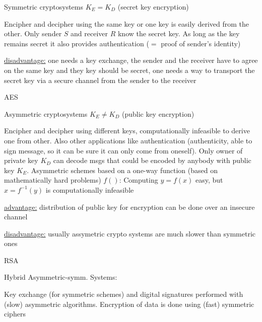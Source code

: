 \documentclass[landscape, a4paper]{article}
\begin{document}
\begin{minipage}[t]{0.2\linewidth}
	\begin{betterlist}
		\item \alert{Symmetric cryptosystems} $K_E = K_D$ (secret key encryption)
		\begin{betterlist}
			\item Encipher and decipher using the same key or one key is easily derived from the other. Only sender $S$ and receiver $R$ know the \alert{secret key}. As long as the key remains secret it also provides \alert{authentication} ($=$ proof of sender’s identity)
			\item \underline{disadvantage:} one needs a \alert{key exchange}, the sender and the receiver have to agree on the same key and they key should be secret, one needs a way to transport the secret key via a secure channel from the sender to the receiver
			\item \alert{AES}
		\end{betterlist}
	\end{betterlist}
	\begin{betterlist}
		\item \alert{Asymmetric cryptosystems} $K_E \ne K_D$ (public key encryption)
		\begin{betterlist}
			\item Encipher and decipher using different keys, computationally infeasible to derive one from other. Also other applications like \alert{authentication} (authenticity, able to sign message, so it can be sure it can only come from oneself). Only owner of \alert{private key} $K_D$ can decode msgs that could be encoded by anybody with \alert{public key} $K_E$. Asymmetric schemes based on a \alert{one-way function} (based on mathematically hard problems) $f()$: Computing $y = f(x)$ easy, but $x = f^{-1}(y)$ is computationally infeasible
			\item \underline{advantage:} distribution of public key for encryption can be done over an insecure channel
			\item \underline{disadvantage:} usually assymetric crypto systems are much slower than symmetric ones
			\item \alert{RSA}
		\end{betterlist}
		\item \alert{Hybrid Asymmetric-symm. Systems:}
		\begin{betterlist}
			\item Key exchange (for symmetric schemes) and digital signatures performed with (slow) asymmetric algorithms. Encryption of data is done using (fast) symmetric ciphers

\end{betterlist}
\end{betterlist}
\end{minipage}
\end{document}
